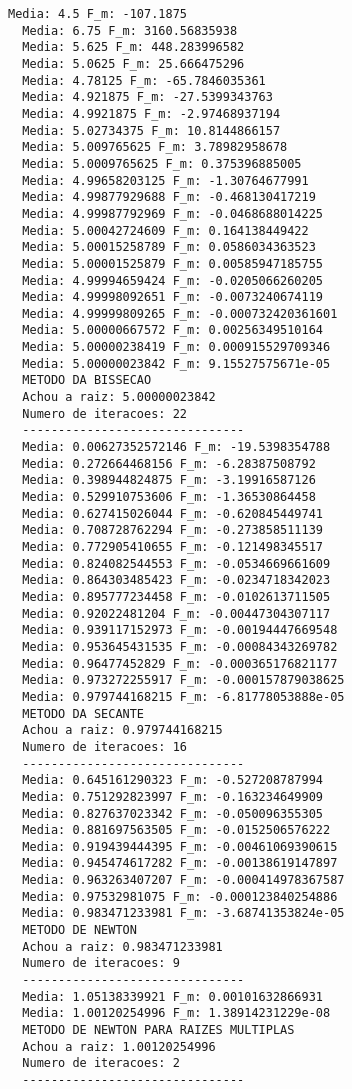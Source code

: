 \documentclass[12pt,a4paper,final]{article}
\begin{document}
\begin{lstlisting}[caption= \textbf{Passo a passo de diferentes algoritmos para determinar a raiz de função com raizes múltiplas.},label={lst:label3}]
  Media: 4.5 F_m: -107.1875
  Media: 6.75 F_m: 3160.56835938
  Media: 5.625 F_m: 448.283996582
  Media: 5.0625 F_m: 25.666475296
  Media: 4.78125 F_m: -65.7846035361
  Media: 4.921875 F_m: -27.5399343763
  Media: 4.9921875 F_m: -2.97468937194
  Media: 5.02734375 F_m: 10.8144866157
  Media: 5.009765625 F_m: 3.78982958678
  Media: 5.0009765625 F_m: 0.375396885005
  Media: 4.99658203125 F_m: -1.30764677991
  Media: 4.99877929688 F_m: -0.468130417219
  Media: 4.99987792969 F_m: -0.0468688014225
  Media: 5.00042724609 F_m: 0.164138449422
  Media: 5.00015258789 F_m: 0.0586034363523
  Media: 5.00001525879 F_m: 0.00585947185755
  Media: 4.99994659424 F_m: -0.0205066260205
  Media: 4.99998092651 F_m: -0.0073240674119
  Media: 4.99999809265 F_m: -0.000732420361601
  Media: 5.00000667572 F_m: 0.00256349510164
  Media: 5.00000238419 F_m: 0.000915529709346
  Media: 5.00000023842 F_m: 9.15527575671e-05
  METODO DA BISSECAO
  Achou a raiz: 5.00000023842
  Numero de iteracoes: 22
  -------------------------------
  Media: 0.00627352572146 F_m: -19.5398354788
  Media: 0.272664468156 F_m: -6.28387508792
  Media: 0.398944824875 F_m: -3.19916587126
  Media: 0.529910753606 F_m: -1.36530864458
  Media: 0.627415026044 F_m: -0.620845449741
  Media: 0.708728762294 F_m: -0.273858511139
  Media: 0.772905410655 F_m: -0.121498345517
  Media: 0.824082544553 F_m: -0.0534669661609
  Media: 0.864303485423 F_m: -0.0234718342023
  Media: 0.895777234458 F_m: -0.0102613711505
  Media: 0.92022481204 F_m: -0.00447304307117
  Media: 0.939117152973 F_m: -0.00194447669548
  Media: 0.953645431535 F_m: -0.00084343269782
  Media: 0.96477452829 F_m: -0.000365176821177
  Media: 0.973272255917 F_m: -0.000157879038625
  Media: 0.979744168215 F_m: -6.81778053888e-05
  METODO DA SECANTE
  Achou a raiz: 0.979744168215
  Numero de iteracoes: 16
  -------------------------------
  Media: 0.645161290323 F_m: -0.527208787994
  Media: 0.751292823997 F_m: -0.163234649909
  Media: 0.827637023342 F_m: -0.050096355305
  Media: 0.881697563505 F_m: -0.0152506576222
  Media: 0.919439444395 F_m: -0.00461069390615
  Media: 0.945474617282 F_m: -0.00138619147897
  Media: 0.963263407207 F_m: -0.000414978367587
  Media: 0.97532981075 F_m: -0.000123840254886
  Media: 0.983471233981 F_m: -3.68741353824e-05
  METODO DE NEWTON
  Achou a raiz: 0.983471233981
  Numero de iteracoes: 9
  -------------------------------
  Media: 1.05138339921 F_m: 0.00101632866931
  Media: 1.00120254996 F_m: 1.38914231229e-08
  METODO DE NEWTON PARA RAIZES MULTIPLAS
  Achou a raiz: 1.00120254996
  Numero de iteracoes: 2
  -------------------------------
\end{lstlisting}
\end{document}
